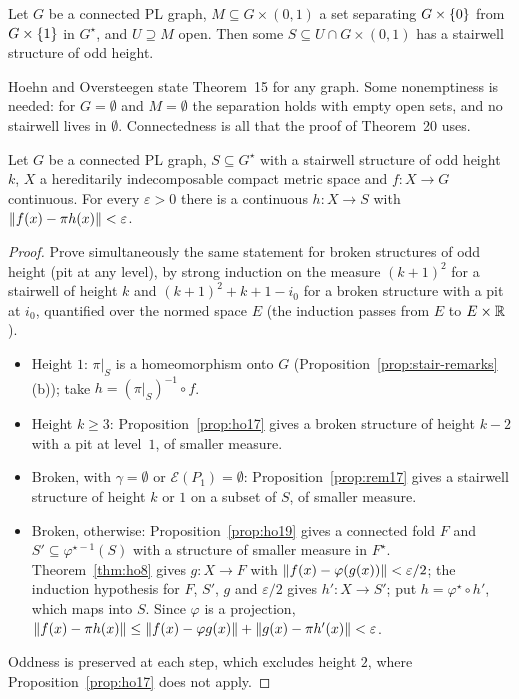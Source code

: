 \begin{theorem}\label{thm:ho15}
Let $G$ be a connected PL graph, $M\subseteq G\times(0,1)$ a set separating $G\times\left\{ 0 \right\}$ from $G\times\left\{ 1 \right\}$ in $G^\star$, and $U\supseteq M$ open. Then some $S\subseteq U\cap G\times(0,1)$ has a
stairwell structure of odd height.
\end{theorem}


Hoehn and Oversteegen state Theorem~15 for any graph. Some nonemptiness is needed: for $G=\emptyset$ and $M=\emptyset$ the separation holds with empty open sets, and no stairwell
lives in $\emptyset$. Connectedness is all that the proof of Theorem~20 uses.

\begin{theorem}\label{thm:lift-stairwell}
Let $G$ be a connected PL graph, $S\subseteq G^\star$ with a stairwell structure of odd height $k$, $X$ a hereditarily indecomposable compact metric space and $f\colon X\to G$ continuous.
For every $\varepsilon>0$ there is a continuous $h\colon X\to S$ with $\lVert f(x)-\pi h(x)\rVert<\varepsilon$.
\end{theorem}

\begin{proof}
Prove simultaneously the same statement for broken structures of odd height (pit at any level), by strong induction on the measure $(k+1)^2$ for a stairwell of height $k$ and
$(k+1)^2+k+1-i_0$ for a broken structure with a pit at $i_0$, quantified over the normed space $E$ (the induction passes from $E$ to $E\times\mathbb{R}$).
\begin{itemize}
\item Height $1$: $\pi|_S$ is a homeomorphism onto $G$ (Proposition~\ref{prop:stair-remarks}(b)); take $h=(\pi|_S)^{-1}\circ f$.
\item Height $k\ge3$: Proposition~\ref{prop:ho17} gives a broken structure of height $k-2$ with a pit at level~$1$, of smaller measure.
\item Broken, with $\gamma=\emptyset$ or $\mathcal E(P_1)=\emptyset$: Proposition~\ref{prop:rem17} gives a stairwell structure of height $k$ or $1$ on a subset of $S$, of smaller measure.
\item Broken, otherwise: Proposition~\ref{prop:ho19} gives a connected fold $F$ and $S'\subseteq\varphi^{\star-1}(S)$ with a structure of smaller measure in $F^\star$. Theorem~\ref{thm:ho8} gives
$g\colon X\to F$ with $\lVert f(x)-\varphi(g(x))\rVert<\varepsilon/2$; the induction hypothesis for $F$, $S'$, $g$ and $\varepsilon/2$ gives $h'\colon X\to S'$; put $h=\varphi^\star\circ h'$, which maps into $S$.
Since $\varphi$ is a projection, $\lVert f(x)-\pi h(x)\rVert\le\lVert f(x)-\varphi g(x)\rVert+\lVert g(x)-\pi h'(x)\rVert<\varepsilon$.
\end{itemize}
Oddness is preserved at each step, which excludes height $2$, where Proposition~\ref{prop:ho17} does not apply.
\end{proof}

